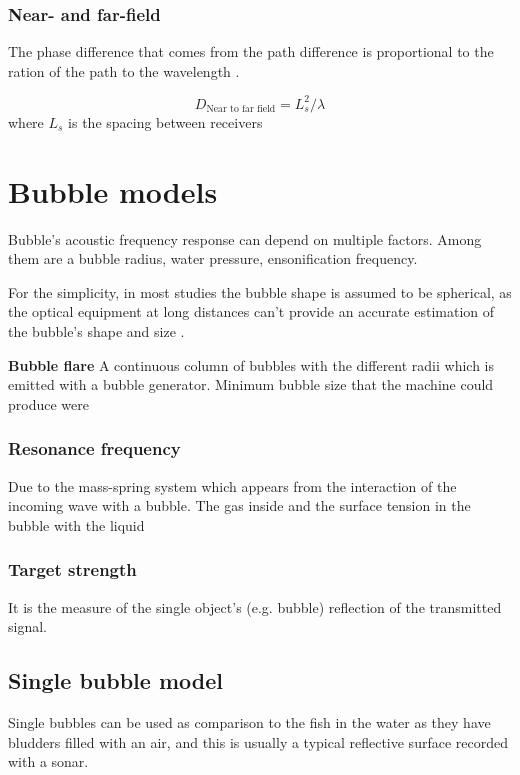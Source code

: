 \subsubsection{Near- and far-field}
The phase difference that comes from the path difference is proportional to the ration of the path to the wavelength \cite[p.30]{leighton_acoustic_2012}.

\[D_\text{Near to far field} = L_s^2/\lambda\] 
where $L_s$ is the spacing between receivers

\section{Bubble models}
Bubble's acoustic frequency response can depend on multiple factors. Among them are a bubble radius, water pressure, ensonification frequency.

For the simplicity, in most studies the bubble shape is assumed to be spherical, as the optical equipment at long distances can't provide an accurate estimation of the bubble's shape and size \cite[p.2]{zhang_efficient_2022}. 

\textbf{Bubble flare} A continuous column of bubbles with the different radii which is emitted with a bubble generator. Minimum bubble size that the machine could produce were 

\subsubsection{Resonance frequency}
Due to the mass-spring system which appears from the interaction of the incoming wave with a bubble. The gas inside and the surface tension in the bubble with the liquid   


\subsubsection{Target strength} 
It is the measure of the single object's (e.g. bubble) reflection of the transmitted signal. %
\subsection{Single bubble model}

Single bubbles can be used as comparison to the fish in the water as they have bludders filled with an air, and this is usually a typical reflective surface recorded with a sonar.

